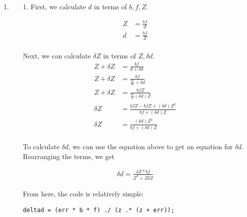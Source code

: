 \documentclass[11pt]{article}
\begin{document}
\begin{enumerate}
\begin{enumerate}
\end{enumerate}

\newpage

\item
\begin{enumerate}
\item[1.]
First, we calculate $d$ in terms of $b, f, Z$.

\begin{align*}
Z &= \frac{bf}{d} \\
d &= \frac{bf}{Z} \\
\end{align*}

Next, we can calculate $\delta Z$ in terms of $Z, \delta d$.
\begin{align*}
Z + \delta Z &= \frac{bf}{d + \delta d} \\
Z + \delta Z &= \frac{bf}{\frac{bf}{Z} + \delta d} \\
Z + \delta Z &= \frac{bfZ}{\frac{bf} + (\delta d) Z} \\
\delta Z &= \frac{bfZ - bfZ + (\delta d) Z^2}{bf + (\delta d) Z} \\
\delta Z &= \frac{(\delta d) Z^2}{bf + (\delta d) Z} \\
\end{align*}

To calculate $\delta d$, we can use the equation above to get an equation for
$\delta d$. Rearranging the terms, we get

\begin{align*}
\delta d = \frac{\delta Z * bf}{Z^2 + Z \delta Z}
\end{align*}

From here, the code is relatively simple:
\begin{verbatim}
deltad = (err * b * f) ./ (z .* (z + err));
\end{verbatim}

\end{enumerate}

\end{enumerate}
\end{document}
